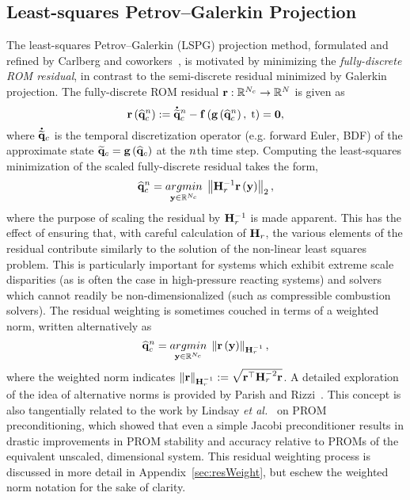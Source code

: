 \subsection{Least-squares Petrov--Galerkin Projection}

The least-squares Petrov--Galerkin (LSPG) projection method, formulated and refined by Carlberg and coworkers~\cite{Carlberg2010,Carlberg2013,Carlberg2017}, is motivated by minimizing the \textit{fully-discrete ROM residual}, in contrast to the semi-discrete residual minimized by Galerkin projection. The fully-discrete ROM residual $\mathbf{r}: \mathbb{R}^{N_c} \rightarrow \mathbb{R}^{N}$ is given as
%
\begin{equation}
    \mathbf{r}\left(\mathbf{\widehat{q}}_{c}^{n}\right) := \accentset{\mbox{\large\bfseries .}}{\mathbf{\widetilde{q}}}_{c}^{n} - \mathbf{f} \left(\mathbf{g} \left(\mathbf{\widehat{q}}_{c}^{n}\right), \; \text{t}\right) = \mathbf{0},
\end{equation}
%
where $\accentset{\mbox{\large\bfseries .}}{\mathbf{\widetilde{q}}}_{c}$ is the temporal discretization operator (e.g. forward Euler, BDF) of the approximate state $\mathbf{\widetilde{q}}_{c} = \mathbf{g} \left(\mathbf{\widehat{q}}_{c}\right)$ at the $n$th time step. Computing the least-squares minimization of the scaled fully-discrete residual takes the form,
%
\begin{equation}\label{eq:lspgLS}
    \consVecCoef^{\timeIdx} = \argmin{\dummyVec \inROne{\numConsModes}} \left\Vert \resScaleInv \resFunc{\dummyVec} \right\Vert_2,
\end{equation}
%
where the purpose of scaling the residual by $\resScaleInv$ is made apparent. This has the effect of ensuring that, with careful calculation of $\resScale$, the various elements of the residual contribute similarly to the solution of the non-linear least squares problem. This is particularly important for systems which exhibit extreme scale disparities (as is often the case in high-pressure reacting systems) and solvers which cannot readily be non-dimensionalized (such as compressible combustion solvers). The residual weighting is sometimes couched in terms of a weighted norm, written alternatively as
%
\begin{equation}
	\consVecCoef^{\timeIdx} = \argmin{\dummyVec \inROne{\numConsModes}} \left\Vert \resFunc{\dummyVec} \right\Vert_{\resScaleInv},
\end{equation}
%
where the weighted norm indicates $\Vert\resVec\Vert_{\resScaleInv} \defEq \sqrt{\resVec^\top \resScale^{-2} \resVec}$. A detailed exploration of the idea of alternative norms is provided by Parish and Rizzi~\cite{Parish2022}. This concept is also tangentially related to the work by Lindsay \textit{et al.}~\cite{Lindsay2022} on PROM preconditioning, which showed that even a simple Jacobi preconditioner results in drastic improvements in PROM stability and accuracy relative to PROMs of the equivalent unscaled, dimensional system. This residual weighting process is discussed in more detail in Appendix~\ref{sec:resWeight}, but eschew the weighted norm notation for the sake of clarity.

